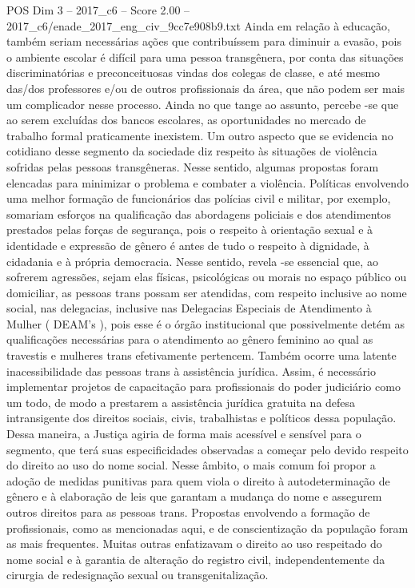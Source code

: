 \begin{textsample}{POS Dim 3 – 2017\_c6 – Score 2.00 – 2017\_c6/enade\_2017\_eng\_civ\_9cc7e908b9.txt}
Ainda em relação à educação, também seriam necessárias ações que contribuíssem para diminuir a evasão, pois o ambiente escolar é difícil para uma pessoa transgênera, por conta das situações discriminatórias e preconceituosas vindas dos colegas de classe, e até mesmo das/dos professores e/ou de outros profissionais da área, que não podem ser mais um complicador nesse processo.
Ainda no que tange ao assunto, percebe -se que ao serem excluídas dos bancos escolares, as oportunidades no mercado de trabalho formal praticamente inexistem.
Um outro aspecto que se evidencia no cotidiano desse segmento da sociedade diz respeito às situações de violência sofridas pelas pessoas transgêneras.
Nesse sentido, algumas propostas foram elencadas para minimizar o problema e combater a violência.
Políticas envolvendo uma melhor formação de funcionários das polícias civil e militar, por exemplo, somariam esforços na qualificação das abordagens policiais e dos atendimentos prestados pelas forças de segurança, pois o respeito à orientação sexual e à identidade e expressão de gênero é antes de tudo o respeito à dignidade, à cidadania e à própria democracia.
Nesse sentido, revela -se essencial que, ao sofrerem agressões, sejam elas físicas, psicológicas ou morais no espaço público ou domiciliar, as pessoas trans possam ser atendidas, com respeito inclusive ao nome social, nas delegacias, inclusive nas Delegacias Especiais de Atendimento à Mulher ( DEAM’s ), pois esse é o órgão institucional que possivelmente detém as qualificações necessárias para o atendimento ao gênero feminino ao qual as travestis e mulheres trans efetivamente pertencem.
Também ocorre uma latente inacessibilidade das pessoas trans à assistência jurídica.
Assim, é necessário implementar projetos de capacitação para profissionais do poder judiciário como um todo, de modo a prestarem a assistência jurídica gratuita na defesa intransigente dos direitos sociais, civis, trabalhistas e políticos dessa população.
Dessa maneira, a Justiça agiria de forma mais acessível e sensível para o segmento, que terá suas especificidades observadas a começar pelo devido respeito do direito ao uso do nome social.
Nesse âmbito, o mais comum foi propor a adoção de medidas punitivas para quem viola o direito à autodeterminação de gênero e à elaboração de leis que garantam a mudança do nome e assegurem outros direitos para as pessoas trans.
Propostas envolvendo a formação de profissionais, como as mencionadas aqui, e de conscientização da população foram as mais frequentes.
Muitas outras enfatizavam o direito ao uso respeitado do nome social e à garantia de alteração do registro civil, independentemente da cirurgia de redesignação sexual ou transgenitalização.

\end{textsample}
